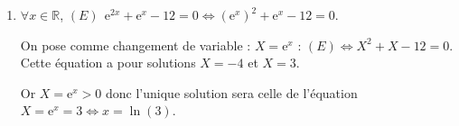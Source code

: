 \documentclass[10pt]{article}
\providecommand{\R}{\mathbb{R}}
\providecommand{\e}{{\mathrm{e}}}
\begin{document}
\begin{enumerate}
Nous savons que : $\displaystyle\lim\limits_{x \rightarrow +\infty} \dfrac{\ln(x)}{x^2}= 0$ (croissances comparées) et
$\displaystyle\lim\limits_{x \rightarrow +\infty} 1+ \dfrac{1}{3x^2}= 1$

donc $\displaystyle\lim\limits_{x \rightarrow +\infty} f(x)= 0$ \hfill {}
\item $\forall x \in \R$,  $(E)~~\e^{2x}+\e^x-12=0 \iff \left(\e^x\right)^2+\e^x-12=0$.

On pose comme changement de variable : $X=\e^x$ : $(E) \iff X^2+X-12=0$. Cette équation a pour solutions $X=-4$ et $X= 3$.

Or $X=\e^x>0$ donc l'unique solution sera celle de l'équation $X=\e^x=3\iff x=\ln(3)$. \hfill {}
\end{enumerate}
\end{document}
